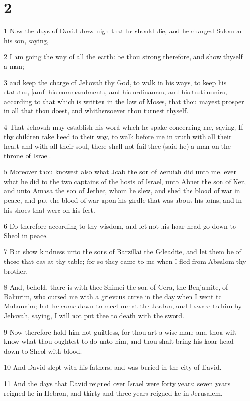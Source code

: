 \chapter{2}

\par 1 Now the days of David drew nigh that he should die; and he charged Solomon his son, saying,
\par 2 I am going the way of all the earth: be thou strong therefore, and show thyself a man;
\par 3 and keep the charge of Jehovah thy God, to walk in his ways, to keep his statutes, [and] his commandments, and his ordinances, and his testimonies, according to that which is written in the law of Moses, that thou mayest prosper in all that thou doest, and whithersoever thou turnest thyself.
\par 4 That Jehovah may establish his word which he spake concerning me, saying, If thy children take heed to their way, to walk before me in truth with all their heart and with all their soul, there shall not fail thee (said he) a man on the throne of Israel.
\par 5 Moreover thou knowest also what Joab the son of Zeruiah did unto me, even what he did to the two captains of the hosts of Israel, unto Abner the son of Ner, and unto Amasa the son of Jether, whom he slew, and shed the blood of war in peace, and put the blood of war upon his girdle that was about his loins, and in his shoes that were on his feet.
\par 6 Do therefore according to thy wisdom, and let not his hoar head go down to Sheol in peace.
\par 7 But show kindness unto the sons of Barzillai the Gileadite, and let them be of those that eat at thy table; for so they came to me when I fled from Absalom thy brother.
\par 8 And, behold, there is with thee Shimei the son of Gera, the Benjamite, of Bahurim, who cursed me with a grievous curse in the day when I went to Mahanaim; but he came down to meet me at the Jordan, and I sware to him by Jehovah, saying, I will not put thee to death with the sword.
\par 9 Now therefore hold him not guiltless, for thou art a wise man; and thou wilt know what thou oughtest to do unto him, and thou shalt bring his hoar head down to Sheol with blood.
\par 10 And David slept with his fathers, and was buried in the city of David.
\par 11 And the days that David reigned over Israel were forty years; seven years reigned he in Hebron, and thirty and three years reigned he in Jerusalem.
